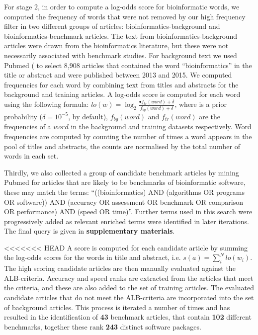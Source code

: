 \documentclass[fleqn,10pt]{SelfArx} %
\begin{document}
For stage 2, in order to compute a log-odds score for bioinformatic words, we computed the frequency of words that were not removed by our high frequency filter in two different groups of articles: bioinformatics-background and bioinformatics-benchmark articles. The text from bioinformatics-background articles were drawn from the bioinformatics literature, but these were not necessarily associated with benchmark studies. For background text we used Pubmed (\cite{Sayers2010-vm,McEntyre2001-fl} to select 8,908 articles that contained the word “bioinformatics” in the title or abstract and were published between 2013 and 2015. We computed frequencies for each word by combining text from titles and abstracts for the background and training articles. A log-odds score is computed for each word using the following formula: $lo(w)=\log_2\frac{•f_{tr}(word)+\delta}{f_{bg}(word)+\delta}$, where  is a prior probability ($\delta = 10^{-5}$, by default), $f_{bg}(word)$ and $f_{tr}(word)$ are the frequencies of a $word$ in the background and training datasets respectively. Word frequencies are computed by counting the number of times a word appears in the pool of titles and abstracts, the counts are normalised by the total number of words in each set. 

Thirdly, we also collected a group of candidate benchmark articles by mining Pubmed for articles that are likely to be benchmarks of bioinformatic software, these may match the terms: “((bioinformatics) AND (algorithms OR programs OR software)) AND (accuracy OR assessment OR benchmark OR comparison OR performance) AND (speed OR time)”. Further terms used in this search were progressively added as relevant enriched terms were identified in later iterations. The final query is given in \textbf{supplementary materials}.

<<<<<<< HEAD
A score is computed for each candidate article by summing the log-odds scores for the words in title and abstract, i.e. $s(a)=\sum_i^Nlo(w_i)$. The high scoring candidate articles are then manually evaluated against the ALB-criteria. Accuracy and speed ranks are extracted from the articles that meet the criteria, and these are also added to the set of training articles. The evaluated candidate articles that do not meet the ALB-criteria are incorporated into the set of background articles. This process is iterated a number of times and has resulted in the identification of \textbf{{\color{black}43}} benchmark articles, that contain \textbf{{\color{black}102}} different benchmarks, together these rank \textbf{{\color{black}243}} distinct software packages.
\end{document}
